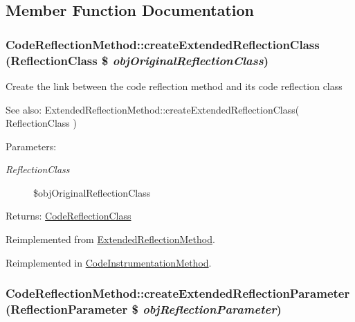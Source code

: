\subsection{Member Function Documentation}
\hypertarget{class_code_reflection_method_84c20b140478480a3bbecda5e9e13702}{
\subsubsection[{createExtendedReflectionClass}]{\setlength{\rightskip}{0pt plus 5cm}CodeReflectionMethod::createExtendedReflectionClass (ReflectionClass \$ {\em objOriginalReflectionClass})}}
\label{class_code_reflection_method_84c20b140478480a3bbecda5e9e13702}


Create the link between the code reflection method and its code reflection class

\begin{Desc}
\item[See also:]ExtendedReflectionMethod::createExtendedReflectionClass( ReflectionClass ) \end{Desc}
\begin{Desc}
\item[Parameters:]
\begin{description}
\item[{\em ReflectionClass}]\$objOriginalReflectionClass \end{description}
\end{Desc}
\begin{Desc}
\item[Returns:]\hyperlink{class_code_reflection_class}{CodeReflectionClass} \end{Desc}


Reimplemented from \hyperlink{class_extended_reflection_method_e5727cf1a1b76d84e56a5fb312989ecb}{ExtendedReflectionMethod}.

Reimplemented in \hyperlink{class_code_instrumentation_method_7dda8c3f7ba312f14dd22d25a2b69ec1}{CodeInstrumentationMethod}.\hypertarget{class_code_reflection_method_33a3dcd4331a02b37addbc2fa9281af6}{
\subsubsection[{createExtendedReflectionParameter}]{\setlength{\rightskip}{0pt plus 5cm}CodeReflectionMethod::createExtendedReflectionParameter (ReflectionParameter \$ {\em objReflectionParameter})}}
\label{class_code_reflection_method_33a3dcd4331a02b37addbc2fa9281af6}


